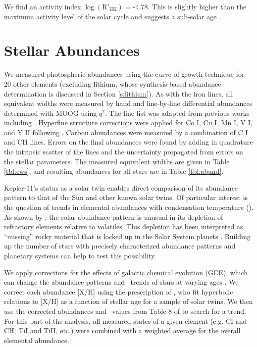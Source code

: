 \documentclass[oneside]{emulateapj}
\begin{document}
We find an activity index $\log(\mathrm{R'_{HK}})$ = -4.78. This is slightly higher than the maximum activity level of the solar cycle and suggests a sub-solar age \citep{Hall2009, Ramirez2014}.


\section{Stellar Abundances}
\label{s:abundances}

We measured photospheric abundances using the curve-of-growth technique for 20 other elements (excluding lithium, whose synthesis-based abundance determination is discussed in Section \ref{s:lithium}). As with the iron lines, all equivalent widths were measured by hand and line-by-line differential abundances determined with MOOG using $q^2$. The line list was adapted from previous works including \citet{Bedell2014}. Hyperfine structure corrections were applied for Co I, Cu I, Mn I, V I, and Y II following . Carbon abundances were measured by a combination of C I and CH lines. Errors on the final abundances were found by adding in quadrature the intrinsic scatter of the lines and the uncertainty propagated from errors on the stellar parameters. The measured equivalent widths are given in Table \ref{tbl:ews}, and resulting abundances for all stars are in Table \ref{tbl:abund}.

Kepler-11's status as a solar twin enables direct comparison of its abundance pattern to that of the Sun and other known solar twins. Of particular interest is the question of trends in elemental abundances with condensation temperature (\tc). As shown by \citet{Melendez2009}, the solar abundance pattern is unusual in its depletion of refractory elements relative to volatiles. This depletion has been interpreted as ``missing'' rocky material that is locked up in the Solar System planets \citep{Chambers2010}. Building up the number of stars with precisely characterized abundance patterns and planetary systems can help to test this possibility.

We apply corrections for the effects of galactic chemical evolution (GCE), which can change the abundance patterns and \tc\ trends of stars at varying ages \citep{Nissen2015, Spina2016}. We correct each abundance [X/H] using the prescription of \citet{Spina2016b}, who fit hyperbolic relations to [X/H] as a function of stellar age for a sample of solar twins. We then use the corrected abundances and \tc\ values from Table 8 of \citet{Lodders2003} to search for a trend. For this part of the analysis, all measured states of a given element (e.g. CI and CH, TiI and TiII, etc.) were combined with a weighted average for the overall elemental abundance. %
\end{document}
